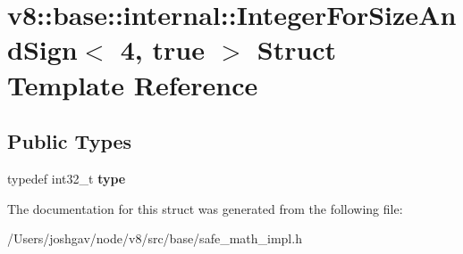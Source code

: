 \hypertarget{structv8_1_1base_1_1internal_1_1_integer_for_size_and_sign_3_014_00_01true_01_4}{}\section{v8\+:\+:base\+:\+:internal\+:\+:Integer\+For\+Size\+And\+Sign$<$ 4, true $>$ Struct Template Reference}
\label{structv8_1_1base_1_1internal_1_1_integer_for_size_and_sign_3_014_00_01true_01_4}
\subsection*{Public Types}
\begin{DoxyCompactItemize}
\item 
typedef int32\+\_\+t {\bfseries type}\hypertarget{structv8_1_1base_1_1internal_1_1_integer_for_size_and_sign_3_014_00_01true_01_4_a6e0dcbaf5e4d56a2c775cb9b27a1cdeb}{}\label{structv8_1_1base_1_1internal_1_1_integer_for_size_and_sign_3_014_00_01true_01_4_a6e0dcbaf5e4d56a2c775cb9b27a1cdeb}

\end{DoxyCompactItemize}


The documentation for this struct was generated from the following file\+:\begin{DoxyCompactItemize}
\item 
/\+Users/joshgav/node/v8/src/base/safe\+\_\+math\+\_\+impl.\+h\end{DoxyCompactItemize}
